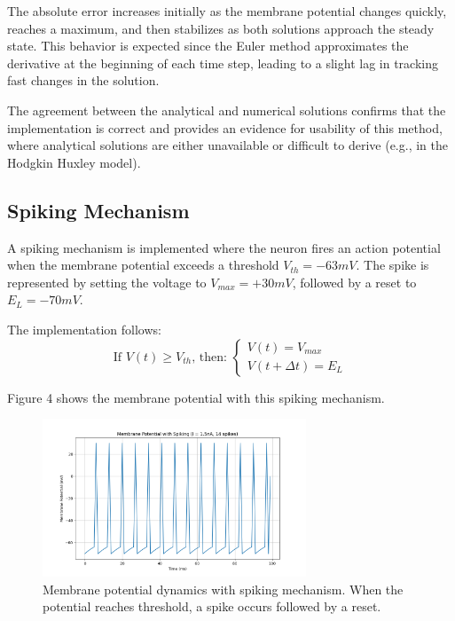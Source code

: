 \documentclass[11pt,a4paper]{article}
\begin{document}
The absolute error increases initially as the membrane potential changes quickly, reaches a maximum, and then stabilizes as both solutions approach the steady state. This behavior is expected since the Euler method approximates the derivative at the beginning of each time step, leading to a slight lag in tracking fast changes in the solution.


The agreement between the analytical and numerical solutions confirms that the implementation is correct and provides an evidence for usability of this method, where analytical solutions are either unavailable or difficult to derive (e.g., in the Hodgkin Huxley model).




\subsection{Spiking Mechanism}

A spiking mechanism is implemented where the neuron fires an action potential when the membrane potential exceeds a threshold $V_{th} = -63mV$. The spike is represented by setting the voltage to $V_{max} = +30mV$, followed by a reset to $E_L = -70mV$.

The implementation follows:
\begin{equation}
\text{If } V(t) \geq V_{th} \text{, then: }
\begin{cases}
V(t) = V_{max} \\
V(t+\Delta t) = E_L
\end{cases}
\end{equation}

Figure 4 shows the membrane potential with this spiking mechanism.

\begin{figure}[H]
\centering
\includegraphics[width=0.7\textwidth]{fig4.png}
\caption{Membrane potential dynamics with spiking mechanism. When the potential reaches threshold, a spike occurs followed by a reset.}
\label{fig:spiking_mechanism}
\end{figure}
\end{document}
